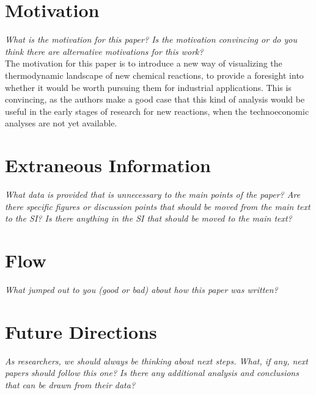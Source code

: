 \documentclass[12pt]{article}
\begin{document}
\section*{Motivation}
\textit{What is the motivation for this paper? Is the motivation convincing or do you think there are alternative motivations for this work?}\\[4pt]
The motivation for this paper is to introduce a new way of visualizing the thermodynamic landscape of new chemical reactions, to provide a foresight into whether it would be worth pursuing them for industrial applications. This is convincing, as the authors make a good case that this kind of analysis would be useful in the early stages of research for new reactions, when the technoeconomic analyses are not yet available.

\section*{Extraneous Information}
\textit{What data is provided that is unnecessary to the main points of the paper? Are there specific figures or discussion points that should be moved from the main text to the SI? Is there anything in the SI that should be moved to the main text?}\\[4pt]

\section*{Flow}
\textit{What jumped out to you (good or bad) about how this paper was written?}\\[4pt]

\section*{Future Directions}
\textit{As researchers, we should always be thinking about next steps. What, if any, next papers should follow this one? Is there any additional analysis and conclusions that can be drawn from their data?}\\[4pt]
\end{document}
